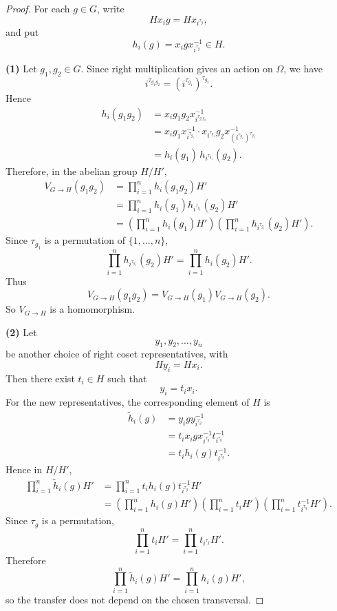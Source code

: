 \begin{proof}
For each $g\in G$, write
\[
    Hx_i g=Hx_{i^{\tau_g}},
\]
and put
\[
    h_i(g)=x_i g x_{i^{\tau_g}}^{-1}\in H.
\]

\textbf{(1)} Let $g_1,g_2\in G$. Since right multiplication gives an action on $\Omega$, we have
\[
    i^{\tau_{g_1g_2}}
    =
    \left(i^{\tau_{g_1}}\right)^{\tau_{g_2}}.
\]
Hence
\[
\begin{aligned}
    h_i(g_1g_2)
    &=
    x_i g_1g_2 x_{i^{\tau_{g_1g_2}}}^{-1} \\[2mm]
    &=
    x_i g_1 x_{i^{\tau_{g_1}}}^{-1}
    \cdot
    x_{i^{\tau_{g_1}}}g_2x_{\left(i^{\tau_{g_1}}\right)^{\tau_{g_2}}}^{-1} \\[2mm]
    &=
    h_i(g_1)\,h_{i^{\tau_{g_1}}}(g_2).
\end{aligned}
\]
Therefore, in the abelian group $H/H'$,
\[
\begin{aligned}
    V_{G\to H}(g_1g_2)
    &=
    \prod_{i=1}^n h_i(g_1g_2)H' \\[2mm]
    &=
    \prod_{i=1}^n
    h_i(g_1)h_{i^{\tau_{g_1}}}(g_2)H' \\[2mm]
    &=
    \left(\prod_{i=1}^n h_i(g_1)H'\right)
    \left(\prod_{i=1}^n h_{i^{\tau_{g_1}}}(g_2)H'\right).
\end{aligned}
\]
Since $\tau_{g_1}$ is a permutation of $\{1,\ldots,n\}$,
\[
    \prod_{i=1}^n h_{i^{\tau_{g_1}}}(g_2)H'
    =
    \prod_{i=1}^n h_i(g_2)H'.
\]
Thus
\[
    V_{G\to H}(g_1g_2)
    =
    V_{G\to H}(g_1)V_{G\to H}(g_2).
\]
So $V_{G\to H}$ is a homomorphism.

\textbf{(2)} Let
\[
    y_1,y_2,\ldots,y_n
\]
be another choice of right coset representatives, with
\[
    Hy_i=Hx_i.
\]
Then there exist $t_i\in H$ such that
\[
    y_i=t_i x_i.
\]
For the new representatives, the corresponding element of $H$ is
\[
\begin{aligned}
    \widetilde{h}_i(g)
    &=
    y_i g y_{i^{\tau_g}}^{-1} \\[2mm]
    &=
    t_i x_i g x_{i^{\tau_g}}^{-1}t_{i^{\tau_g}}^{-1} \\[2mm]
    &=
    t_i h_i(g)t_{i^{\tau_g}}^{-1}.
\end{aligned}
\]
Hence in $H/H'$,
\[
\begin{aligned}
    \prod_{i=1}^n \widetilde{h}_i(g)H'
    &=
    \prod_{i=1}^n t_i h_i(g)t_{i^{\tau_g}}^{-1}H' \\[2mm]
    &=
    \left(\prod_{i=1}^n h_i(g)H'\right)
    \left(\prod_{i=1}^n t_iH'\right)
    \left(\prod_{i=1}^n t_{i^{\tau_g}}^{-1}H'\right).
\end{aligned}
\]
Since $\tau_g$ is a permutation,
\[
    \prod_{i=1}^n t_iH'
    =
    \prod_{i=1}^n t_{i^{\tau_g}}H'.
\]
Therefore
\[
    \prod_{i=1}^n \widetilde{h}_i(g)H'
    =
    \prod_{i=1}^n h_i(g)H',
\]
so the transfer does not depend on the chosen transversal.


\end{proof}
